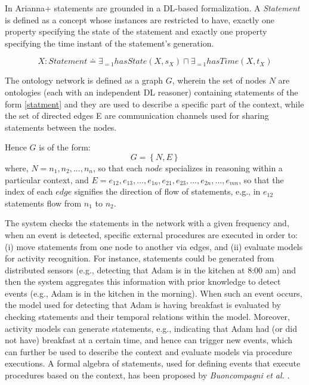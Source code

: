 \documentclass{thesisreport}
\begin{document}
 In Arianna+ statements are grounded in a DL-based formalization. A \emph{Statement} is defined as a concept whose instances are restricted to have, exactly one property specifying the state of the statement and exactly one property specifying the time instant of the statement's generation.
 
 \begin{equation}
     X : Statement \doteq \exists_{=1} hasState(X, s_X) \sqcap \exists_{=1} hasTime(X, t_X)
     \label{statment}
 \end{equation}
 
 The ontology network is defined as a graph $G$, wherein the set of nodes $N$ are ontologies (each with an independent DL reasoner) containing statements of the form \ref{statment} and they are used to describe a specific part of the context, while the set of directed edges E are communication channels used for sharing statements between the nodes.
 
 Hence $G$ is of the form:
 \begin{equation}
     G = \left \{ N, E \right \}
 \end{equation}
 where, $N = n_1, n_2, ... , n_n$, so that each $node$ specializes in reasoning within a particular context, and $ E = e_{12},e_{13},...,e_{1n},e_{21},e_{23},...,e_{2n},...,e_{mn}$, so that the index of each $edge$ signifies the direction of flow of statements, e.g., in $e_{12}$ statements flow from $n_1$ to $n_2$. 
 
 The system checks the statements in the network with a given frequency and, when an event is detected, specific external procedures are executed in order to: (i) move statements from one node to another via edges, and (ii) evaluate models for activity recognition. For instance, statements could be generated from distributed sensors (e.g., detecting that Adam is in the kitchen at 8:00 am) and then the system aggregates this information with prior knowledge to detect events (e.g., Adam is in the kitchen in the morning). When such an event occurs, the model used for detecting that Adam is having breakfast is evaluated by checking statements and their temporal relations within the model.
 Moreover, activity models can generate statements, e.g., indicating that Adam had (or did not have) breakfast at a certain time, and hence can trigger new events, which can further be used to describe the context and evaluate models via procedure executions. A formal algebra of statements, used for defining events that execute procedures based on the context, has been proposed by \textit{Buoncompagni et al.} \cite{buoncompagni2017towards}.
 
\end{document}
